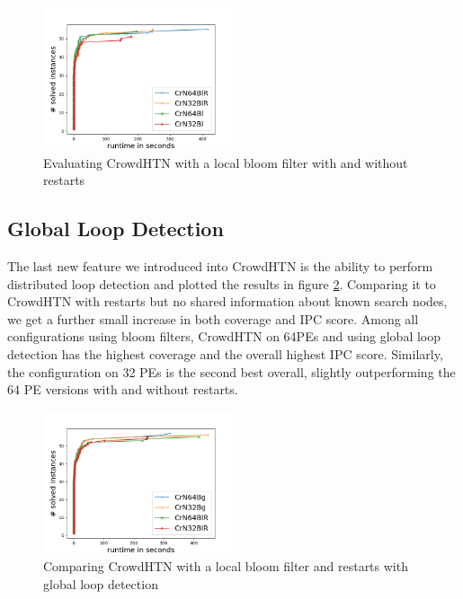 \begin{figure}[!hbp]
	\caption{Evaluating CrowdHTN with a local bloom filter with and without restarts}
	\label{figure: restarts}
	\centering
	\includegraphics[width=0.5\textwidth]{images/final/restarts}
\end{figure}
\todo{}

\subsection{Global Loop Detection}
\label{eval: global loop}
The last new feature we introduced into CrowdHTN is the ability to perform distributed loop detection and plotted the results in figure \ref{figure: global loops}. Comparing it to CrowdHTN with restarts but no shared information about known search nodes, we get a further small increase in both coverage and IPC score. Among all configurations using bloom filters, CrowdHTN on 64PEs and using global loop detection has the highest coverage and the overall highest IPC score. Similarly, the configuration on 32 PEs is the second best overall, slightly outperforming the 64 PE versions with and without restarts.

\begin{figure}[!hbp]
	\caption{Comparing CrowdHTN with a local bloom filter and restarts with global loop detection}
	\label{figure: global loops}
	\centering
	\includegraphics[width=0.5\textwidth]{images/final/global_loops}
\end{figure}

